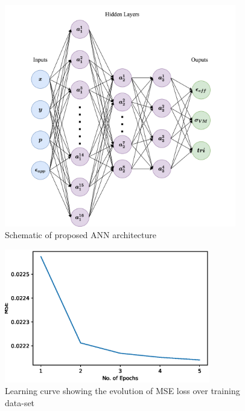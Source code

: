 \begin{figure}[!h]
	\centering
	\includegraphics[width=0.9\textwidth]{Pictures/my-ann.png}
	\hspace{1mm}
	\caption{Schematic of proposed ANN architecture} 
	\label{fig:my-ann}
\end{figure}
\begin{figure}[!h]
	\centering
	\includegraphics[width=0.8\textwidth]{Pictures/training_process.eps}
	\hspace{1mm}
	\caption{Learning curve showing the evolution of MSE loss over training data-set} 
	\label{fig:ann-training}
\end{figure}


